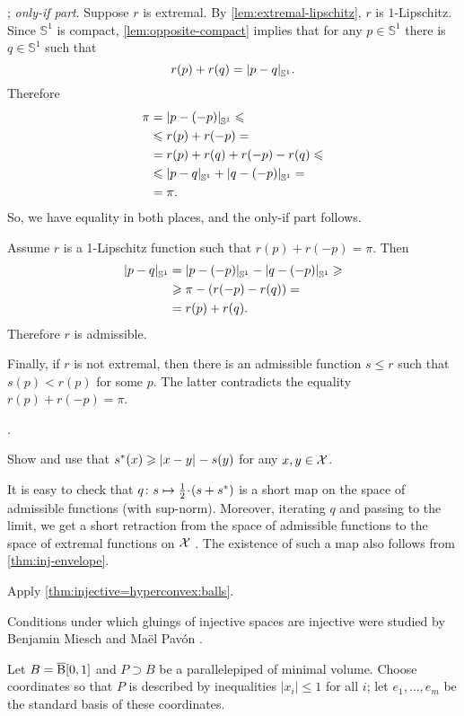 \parbf{\ref{ex:circle}}; \textit{only-if part}.
Suppose $r$ is extremal.
By \ref{lem:extremal-lipschitz}, $r$ is $1$-Lipschitz.
Since $\mathbb{S}^1$ is compact, \ref{lem:opposite-compact} implies that for any $p\in \mathbb{S}^1$ there is $q\in \mathbb{S}^1$ such that 
\[r(p)+r (q) = \dist{p}{q}{\mathbb{S}^1}.\]
Therefore
\begin{align*}
\pi&=\dist{p}{(-p)}{\mathbb{S}^1}\le 
\\
&\le 
r(p)+r(-p)=
\\
&=
r(p)+r(q) +r(-p) -r(q)\le
\\
&\le
\dist{p}{q}{\mathbb{S}^1}+\dist{q}{(-p)}{\mathbb{S}^1}=
\\
&=\pi.
\end{align*}
So, we have equality in both places, and the only-if part follows.

Assume $r$ is a 1-Lipschitz function such that $r(p)+r(-p)=\pi$.
Then 
\begin{align*}
\dist pq{\mathbb{S}^1}&=
\dist{p}{(-p)}{\mathbb{S}^1}-\dist{q}{(-p)}{\mathbb{S}^1}\ge
\\
&\ge\pi -(r(-p)-r(q))=
\\
&=r(p)+r(q).
\end{align*}
Therefore $r$ is admissible.

Finally, if $r$ is not extremal, then there is an admissible function $s\le r$ such that $s(p)<r(p)$ for some $p$.
The latter contradicts the equality $r(p)+r(-p)=\pi$.

 \cite[Proposition 2.7]{zuest}.

Show and use that
$s^*(x)\ge \dist{x}{y}{}-s(y)$
for any $x,y\in \mathcal{X}$.

It is easy to check that $q\:s\z\mapsto \tfrac12\cdot(s+s^*)$ is a short map on the space of admissible functions (with sup-norm).
Moreover, iterating $q$ and passing to the limit, we get a short retraction from the space of admissible functions to the space of extremal functions on $\mathcal{X}$ \cite[see 3.1 in][]{lang-2013}.
The existence of such a map also follows from \ref{thm:inj-envelope}.

Apply \ref{thm:injective=hyperconvex:balls}.

Conditions under which gluings of injective spaces are injective were studied by Benjamin Miesch and Maël Pavón \cite{miesch,miesch-pavon}.

Let $B=\overline{\mathrm{B}}{}[0,1]$ and $P\supset B$ be a parallelepiped of minimal volume.
Choose coordinates so that $P$ is described by inequalities
$|x_i|\le 1$ for all $i$;
let $e_1,\dots,e_m$ be the standard basis of these coordinates.

